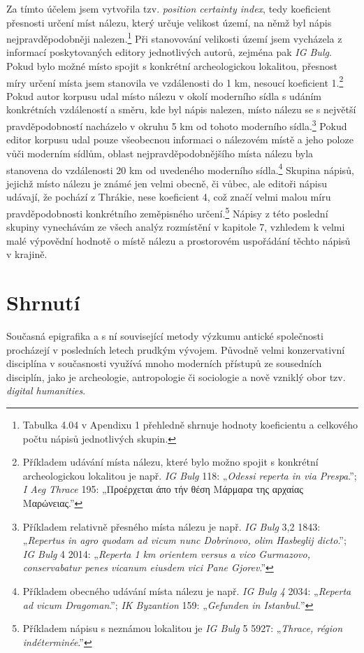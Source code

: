 Za tímto účelem jsem vytvořila tzv. {\em position certainty index}, tedy koeficient přesnosti určení míst nálezu, který určuje velikost území, na němž byl nápis nejpravděpodobněji nalezen.\footnote{Tabulka 4.04 v Apendixu 1 přehledně shrnuje hodnoty koeficientu a celkového počtu nápisů jednotlivých skupin.} Při stanovování velikosti území jsem vycházela z informací poskytovaných editory jednotlivých autorů, zejména pak {\em IG Bulg}. Pokud bylo možné místo spojit s konkrétní archeologickou lokalitou, přesnost míry určení místa jsem stanovila ve vzdálenosti do 1 km, nesoucí koeficient 1.\footnote{Příkladem udávání místa nálezu, které bylo možno spojit s konkrétní archeologickou lokalitou je např. {\em IG Bulg} 118: „{\em Odessi reperta in via Prespa}.”; {\em I Aeg Thrace} 195: „Προέρχεται άπο τήν θέση Μάρμαρα της αρχαίας Μαρώνειας.”} Pokud autor korpusu udal místo nálezu v okolí moderního sídla s udáním konkrétních vzdáleností a směru, kde byl nápis nalezen, místo nálezu se s největší pravděpodobností nacházelo v okruhu 5 km od tohoto moderního sídla.\footnote{Příkladem relativně přesného místa nálezu je např. {\em IG Bulg} 3,2 1843: „{\em Repertus in agro quodam ad vicum nunc Dobrinovo, olim Hasbeglij dicto}.”; {\em IG Bulg} 4 2014: „{\em Reperta 1 km orientem versus a vico Gurmazovo, conservabatur penes vicanum eiusdem vici Pane Gjorev}.”} Pokud editor korpusu udal pouze všeobecnou informaci o nálezovém místě a jeho poloze vůči moderním sídlům, oblast nejpravděpodobnějšího místa nálezu byla stanovena do vzdálenosti 20 km od uvedeného moderního sídla.\footnote{Příkladem obecného udávání místa nálezu je např. {\em IG Bulg 4} 2034: „{\em Reperta ad vicum Dragoman}.”; {\em IK Byzantion} 159: „{\em Gefunden in Istanbul.}”} Skupina nápisů, jejichž místo nálezu je známé jen velmi obecně, či vůbec, ale editoři nápisu udávají, že pochází z Thrákie, nese koeficient 4, což značí velmi malou míru pravděpodobnosti konkrétního zeměpisného určení.\footnote{Příkladem nápisu s neznámou lokalitou je {\em IG Bulg} 5 5927: „{\em Thrace, région indéterminée}.”} Nápisy z této poslední skupiny vynechávám ze všech analýz rozmístění v kapitole 7, vzhledem k velmi malé výpovědní hodnotě o místě nálezu a prostorovém uspořádání těchto nápisů v krajině.

\section[shrnutí-1]{Shrnutí}

Současná epigrafika a s ní související metody výzkumu antické společnosti procházejí v posledních letech prudkým vývojem. Původně velmi konzervativní disciplína v současnosti využívá mnoho moderních přístupů ze sousedních disciplín, jako je archeologie, antropologie či sociologie a nově vzniklý obor tzv. {\em digital humanities}.

